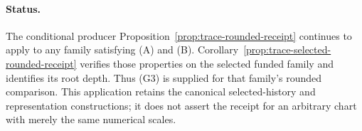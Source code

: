 \paragraph{Status.}
The conditional producer Proposition~\ref{prop:trace-rounded-receipt}
continues to apply to any family satisfying (A) and (B).
Corollary~\ref{prop:trace-selected-rounded-receipt} verifies those
properties on the selected funded family and identifies its root depth.
Thus (G3) is supplied for that family's rounded comparison. This
application retains the canonical selected-history and representation
constructions; it does not assert the receipt for an arbitrary chart
with merely the same numerical scales.
